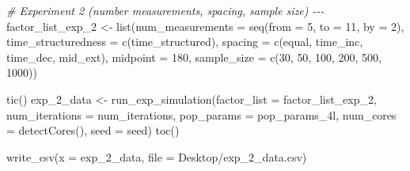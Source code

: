 \documentclass[
12pt, %
twoside,
english]{guelphthesis}
\newenvironment{Shaded}{\begin{snugshade}}{\end{snugshade}}
\newcommand{\AttributeTok}[1]{\textcolor[rgb]{0.77,0.63,0.00}{#1}}
\newcommand{\CommentTok}[1]{\textcolor[rgb]{0.56,0.35,0.01}{\textit{#1}}}
\newcommand{\DecValTok}[1]{\textcolor[rgb]{0.00,0.00,0.81}{#1}}
\newcommand{\FunctionTok}[1]{\textcolor[rgb]{0.00,0.00,0.00}{#1}}
\newcommand{\NormalTok}[1]{#1}
\newcommand{\OtherTok}[1]{\textcolor[rgb]{0.56,0.35,0.01}{#1}}
\newcommand{\StringTok}[1]{\textcolor[rgb]{0.31,0.60,0.02}{#1}}
\begin{document}
\begin{Shaded}
\begin{Highlighting}[numbers=left,,]
\CommentTok{\# Experiment 2 (number measurements, spacing,  sample size) {-}{-}{-}}
\NormalTok{factor\_list\_exp\_2 }\OtherTok{\textless{}{-}} \FunctionTok{list}\NormalTok{(}\StringTok{\textquotesingle{}num\_measurements\textquotesingle{}} \OtherTok{=} \FunctionTok{seq}\NormalTok{(}\AttributeTok{from =} \DecValTok{5}\NormalTok{, }\AttributeTok{to =} \DecValTok{11}\NormalTok{, }\AttributeTok{by =} \DecValTok{2}\NormalTok{), }
                          \StringTok{\textquotesingle{}time\_structuredness\textquotesingle{}} \OtherTok{=} \FunctionTok{c}\NormalTok{(}\StringTok{\textquotesingle{}time\_structured\textquotesingle{}}\NormalTok{),}
                          \StringTok{\textquotesingle{}spacing\textquotesingle{}} \OtherTok{=} \FunctionTok{c}\NormalTok{(}\StringTok{\textquotesingle{}equal\textquotesingle{}}\NormalTok{, }\StringTok{\textquotesingle{}time\_inc\textquotesingle{}}\NormalTok{, }\StringTok{\textquotesingle{}time\_dec\textquotesingle{}}\NormalTok{, }\StringTok{\textquotesingle{}mid\_ext\textquotesingle{}}\NormalTok{),}
                          \StringTok{\textquotesingle{}midpoint\textquotesingle{}} \OtherTok{=} \DecValTok{180}\NormalTok{, }
                          \StringTok{\textquotesingle{}sample\_size\textquotesingle{}} \OtherTok{=} \FunctionTok{c}\NormalTok{(}\DecValTok{30}\NormalTok{, }\DecValTok{50}\NormalTok{, }\DecValTok{100}\NormalTok{, }\DecValTok{200}\NormalTok{, }\DecValTok{500}\NormalTok{, }\DecValTok{1000}\NormalTok{))}

\FunctionTok{tic}\NormalTok{()}
\NormalTok{exp\_2\_data }\OtherTok{\textless{}{-}} \FunctionTok{run\_exp\_simulation}\NormalTok{(}\AttributeTok{factor\_list =}\NormalTok{ factor\_list\_exp\_2, }\AttributeTok{num\_iterations =}\NormalTok{ num\_iterations, }\AttributeTok{pop\_params =}\NormalTok{ pop\_params\_4l, }
                                 \AttributeTok{num\_cores =} \FunctionTok{detectCores}\NormalTok{(), }\AttributeTok{seed =}\NormalTok{ seed)}
\FunctionTok{toc}\NormalTok{()}

\FunctionTok{write\_csv}\NormalTok{(}\AttributeTok{x =}\NormalTok{ exp\_2\_data, }\AttributeTok{file =} \StringTok{\textquotesingle{}Desktop/exp\_2\_data.csv\textquotesingle{}}\NormalTok{)}


\end{Highlighting}
\end{Shaded}
\end{document}

